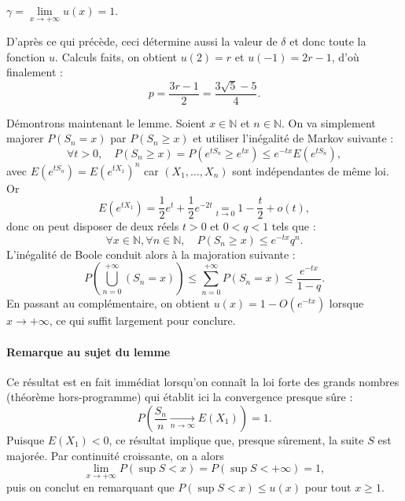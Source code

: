 \begin{lemme}
$\gamma = \lim\limits_{x\to +\infty} u(x) = 1$.
\end{lemme}

D'après ce qui précède, ceci détermine aussi la valeur de $\delta$ et donc toute la fonction $u$. Calculs faits, on obtient $u(2) = r$ et $u(-1) = 2r-1$, d'où finalement :
\[
{p = \dfrac{3r-1}{2} = \dfrac{3\sqrt 5 - 5}{4}}.
\]


Démontrons maintenant le lemme. Soient $x \in \mathbb N$ et $n \in \mathbb N$. On va simplement majorer $P(S_n = x)$ par $P(S_n \geqslant x)$ et utiliser l'inégalité de Markov suivante :
$$
\forall t > 0,\quad P(S_n \geqslant x) = P(e^{t S_n} \geqslant e^{tx}) \leqslant e^{-tx} E(e^{t S_n}),
$$
avec $E(e^{tS_n}) = E(e^{tX_1})^n$ car $(X_1,\dots,X_n)$ sont indépendantes de même loi. Or
$$
E(e^{tX_1}) = \frac12 e^t + \frac12 e^{-2t} \underset{t\to 0}{=} 1 - \frac t2 + o(t),
$$
donc on peut disposer de deux réels $t > 0$ et $0 < q < 1$ tels que :
$$
\forall x\in \mathbb N,\forall n \in \mathbb N,\quad P(S_n \geqslant x) \leqslant e^{-tx} q^n.
$$
L'inégalité de Boole conduit alors à la majoration suivante :
$$
P\left(\bigcup_{n=0}^{+\infty} (S_n = x)\right) \leqslant \sum_{n=0}^{+\infty} P(S_n = x) \leqslant \frac{e^{-tx}}{1-q}.
$$
En passant au complémentaire, on obtient $u(x) = 1 -O(e^{-tx})$ lorsque $x \to +\infty$, ce qui suffit largement pour conclure.


\paragraph{Remarque au sujet du lemme}

Ce résultat est en fait immédiat lorsqu'on connaît la loi forte des grands nombres (théorème hors-programme) qui établit ici la convergence presque sûre :
\[
P\left(\frac{S_n}{n} \xrightarrow[n\to\infty]{} E(X_1)\right) = 1.
\]
Puisque $E(X_1) < 0$, ce résultat implique que, presque sûrement, la suite $S$ est majorée. Par continuité croissante, on a alors
\[
\lim_{x\to+\infty} P(\sup S < x) = P(\sup S < +\infty) = 1,
\]
puis on conclut en remarquant que $P(\sup S < x) \leqslant u(x)$ pour tout $x \geqslant 1$.


